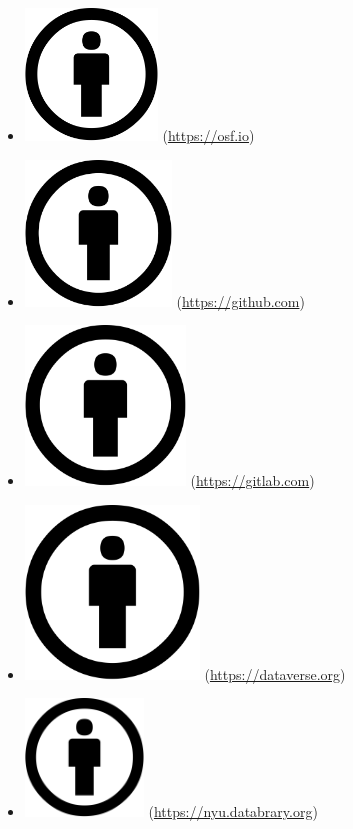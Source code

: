 \documentclass[
  11pt,
]{book}
\providecommand{\tightlist}{%
  \setlength{\itemsep}{0pt}\setlength{\parskip}{0pt}}
\begin{document}
\begin{itemize}
  \begin{itemize}
  \tightlist
  \item
    \includegraphics[width=9.5em,height=\textheight]{images/projects/by-credits.png} (\url{https://osf.io})
  \item
    \includegraphics[width=10.5em,height=\textheight]{images/projects/by-credits.png} (\url{https://github.com})
  \item
    \includegraphics[width=11.5em,height=\textheight]{images/projects/by-credits.png} (\url{https://gitlab.com})
  \item
    \includegraphics[width=12.5em,height=\textheight]{images/projects/by-credits.png} (\url{https://dataverse.org})
  \item
    \includegraphics[width=8.5em,height=\textheight]{images/projects/by-credits.png} (\url{https://nyu.databrary.org})

\end{itemize}
\end{itemize}
\end{document}
